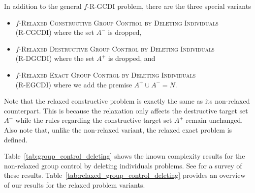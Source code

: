 \documentclass[
    12pt,               %
    a4paper,            %
    bibtotoc,           %
    pointlessnumbers,   %
    ngerman,            %
    titlepage,          %
    leqno,              %
    ]{scrarticle}       %
\newcommand\tableref{Table~\ref}
\begin{document}
In addition to the general $f$-R-GCDI problem, there are the three special variants
\begin{itemize}
\item
$f$-\textsc{Relaxed Constructive Group Control by Deleting Individuals} \\ (R-CGCDI) where the set $A^-$ is dropped,
\item
$f$-\textsc{Relaxed Destructive Group Control by Deleting Individuals} \\ (R-DGCDI) where the set $A^+$ is dropped, and
\item
$f$-\textsc{Relaxed Exact Group Control by Deleting Individuals} \\ (R-EGCDI) where we add the premise $A^+ \cup A^- = N$.
\end{itemize}



Note that the relaxed constructive problem is exactly the same as its non-relaxed counterpart. This is because the relaxation only affects the destructive target set $A^-$ while the rules regarding the constructive target set $A^+$ remain unchanged. Also note that, unlike the non-relaxed variant, the relaxed exact problem is defined.



\tableref{tab:group_control_deleting} shows the known complexity results for the non-relaxed group control by deleting individuals problems. See \textcite{J22} for a survey of these results. \tableref{tab:relaxed_group_control_deleting} provides an overview of our results for the relaxed problem variants.

\renewcommand{\arraystretch}{1.8}
\end{document}
